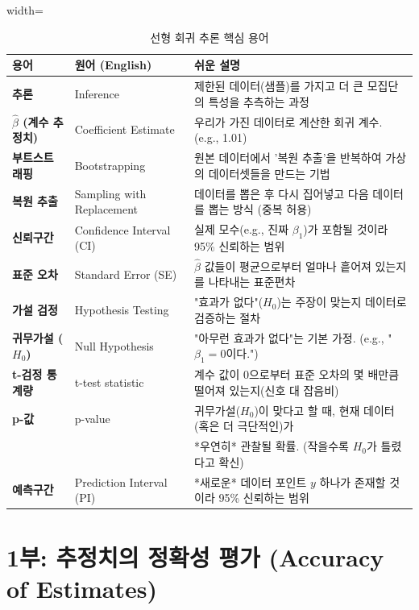 \documentclass[11pt,a4paper]{book}
\theoremstyle{definition}
\begin{document}
\begin{table}[h!]
\centering
\caption{선형 회귀 추론 핵심 용어}
\label{tab:terms}
\begin{adjustbox}{width=\textwidth}
\begin{tabular}{@{}lll@{}}
\toprule
용어 & 원어 (English) & 쉬운 설명 \\
\midrule
\textbf{추론} & Inference & 제한된 데이터(샘플)를 가지고 더 큰 모집단의 특성을 추측하는 과정 \\
\textbf{$\hat{\beta}$ (계수 추정치)} & Coefficient Estimate & 우리가 가진 데이터로 계산한 회귀 계수. (e.g., 1.01) \\
\textbf{부트스트래핑} & Bootstrapping & 원본 데이터에서 '복원 추출'을 반복하여 가상의 데이터셋들을 만드는 기법 \\
\textbf{복원 추출} & Sampling with Replacement & 데이터를 뽑은 후 다시 집어넣고 다음 데이터를 뽑는 방식 (중복 허용) \\
\textbf{신뢰구간} & Confidence Interval (CI) & 실제 모수(e.g., 진짜 $\beta_1$)가 포함될 것이라 95\% 신뢰하는 범위 \\
\textbf{표준 오차} & Standard Error (SE) & $\hat{\beta}$ 값들이 평균으로부터 얼마나 흩어져 있는지를 나타내는 표준편차 \\
\textbf{가설 검정} & Hypothesis Testing & "효과가 없다"($H_0$)는 주장이 맞는지 데이터로 검증하는 절차 \\
\textbf{귀무가설 ($H_0$)} & Null Hypothesis & "아무런 효과가 없다"는 기본 가정. (e.g., "$\beta_1 = 0$이다.") \\
\textbf{t-검정 통계량} & t-test statistic & 계수 값이 0으로부터 표준 오차의 몇 배만큼 떨어져 있는지(신호 대 잡음비) \\
\textbf{p-값} & p-value & 귀무가설($H_0$)이 맞다고 할 때, 현재 데이터(혹은 더 극단적인)가 \\
& & *우연히* 관찰될 확률. (작을수록 $H_0$가 틀렸다고 확신) \\
\textbf{예측구간} & Prediction Interval (PI) & *새로운* 데이터 포인트 $y$ 하나가 존재할 것이라 95\% 신뢰하는 범위 \\
\bottomrule
\end{tabular}
\end{adjustbox}
\end{table}


\section{1부: 추정치의 정확성 평가 (Accuracy of Estimates)}
\end{document}

